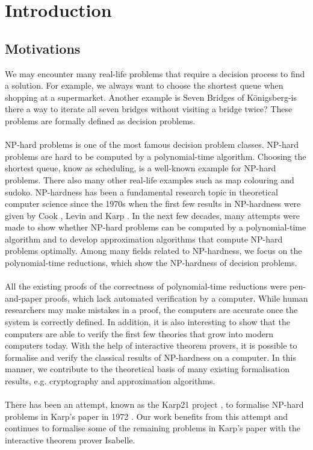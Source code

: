 \chapter{Introduction}\label{chapter:introduction}
\section{Motivations}
We may encounter many real-life problems that require a decision process to find a solution. 
For example, we always want to choose the shortest queue when shopping at a supermarket. 
Another example is Seven Bridges of Königsberg-is there a way to iterate all seven bridges 
without visiting a bridge twice? These problems are formally defined as decision problems.\\\\
NP-hard problems is one of the most famous decision problem classes.
NP-hard problems are hard to be computed by a polynomial-time algorithm. Choosing the shortest queue, 
know as scheduling, is a well-known example for NP-hard problems. There also many other real-life examples
such as map colouring and sudoko.
NP-hardness has been a fundamental research topic in theoretical computer science since the 1970s
when the first few results in NP-hardness were given by Cook \cite{cook2023complexity}, Levin \cite{levin1973universal} 
and Karp \cite{karp2010reducibility}. 
In the next few decades, many attempts were made to show whether NP-hard problems can be computed by a polynomial-time algorithm and to develop approximation algorithms that compute NP-hard problems optimally. 
Among many fields related to NP-hardness, we focus on the polynomial-time reductions, which show the NP-hardness of decision problems. \\\\
All the existing proofs of the correctness of polynomial-time reductions were pen-and-paper proofs, 
which lack automated verification by a computer. 
While human researchers may make mistakes in a proof, the computers are accurate once the system is correctly defined. In addition, 
it is also interesting to show that the computers are able to verify the first few theories that grow into modern computers today.
With the help of interactive theorem provers, 
it is possible to formalise and verify the classical results of NP-hardness on a computer.
In this manner, we contribute to the theoretical basis of many existing formalisation results, 
e.g. cryptography and approximation algorithms. \\\\ 
There has been an attempt, known as the Karp21 project \cite{polyred}, to formalise NP-hard problems in Karp's paper in 1972 \cite{karp2010reducibility}. 
Our work benefits from this attempt and continues to formalise some of the remaining problems in Karp's paper 
with the interactive theorem prover Isabelle. 

